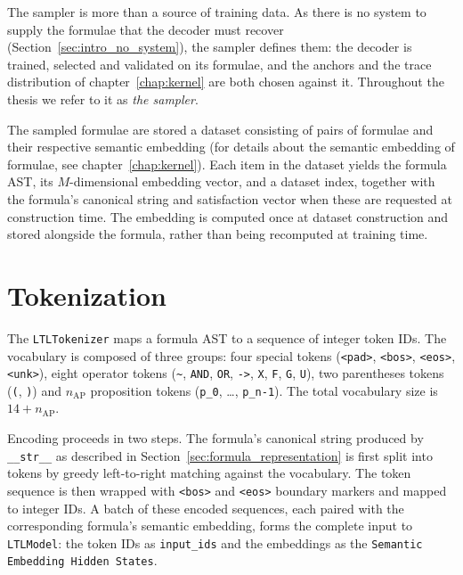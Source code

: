 \documentclass[titlepage,a4paper,11pt]{report}
\newenvironment{RSnewblock}{\par\color{blue!65!black}}{\par}
\begin{document}
    \begin{RSnewblock}
    The sampler is more than a source of training data. As there is no system to supply the formulae that the decoder must recover (Section~\ref{sec:intro_no_system}), the sampler defines them: the decoder is trained, selected and validated on its formulae, and the anchors and the trace distribution of chapter~\ref{chap:kernel} are both chosen against it. Throughout the thesis we refer to it as \emph{the sampler}.
    \end{RSnewblock}

    The sampled formulae are stored a dataset consisting of pairs of formulae and their respective semantic embedding (for details about the semantic embedding of formulae, see chapter~\ref{chap:kernel}). Each item in the dataset yields the formula AST, its $M$-dimensional embedding vector, and a dataset index, together with the formula's canonical string and satisfaction vector when these are requested at construction time. The embedding is computed once at dataset construction and stored alongside the formula, rather than being recomputed at training time.

    \section{Tokenization}\label{sec:tokenization}
    The \texttt{LTLTokenizer} maps a formula AST to a sequence of integer token IDs. The vocabulary is composed of three groups: four special tokens (\texttt{<pad>}, \texttt{<bos>}, \texttt{<eos>}, \texttt{<unk>}), eight operator tokens (\texttt{\textasciitilde}, \texttt{AND}, \texttt{OR}, \texttt{->}, \texttt{X}, \texttt{F}, \texttt{G}, \texttt{U}), two parentheses tokens (\texttt{(}, \texttt{)}) and $n_{\text{AP}}$ proposition tokens (\texttt{p\_0}, \ldots, \texttt{p\_{n-1}}). The total vocabulary size is $14 + n_{\text{AP}}$.
    
    Encoding proceeds in two steps. The formula's canonical string produced by \texttt{\_\_str\_\_} as described in Section~\ref{sec:formula_representation} is first split into tokens by greedy left-to-right matching against the vocabulary. The token sequence is then wrapped with \texttt{<bos>} and \texttt{<eos>} boundary markers and mapped to integer IDs. A batch of these encoded sequences, each paired with the corresponding formula's semantic embedding, forms the complete input to \texttt{LTLModel}: the token IDs as \texttt{input\_ids} and the embeddings as the \texttt{Semantic Embedding Hidden States}.
\end{document}
